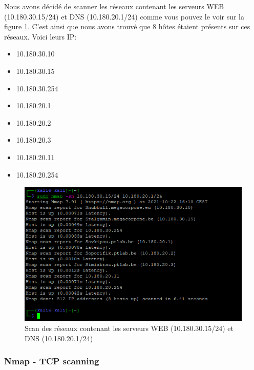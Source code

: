 \documentclass[french,paper=a4,oneside,captions=tableheading]{article}
\begin{document}
Nous avons décidé de scanner les réseaux contenant les serveurs WEB (10.180.30.15/24) et DNS (10.180.20.1/24) comme vous pouvez le voir sur la figure \ref{fig:NetworkScan}. C'est ainsi que nous avons trouvé que 8 hôtes étaient présents sur ces réseaux. Voici leurs IP:
\begin{itemize}
    \item 10.180.30.10
    \item 10.180.30.15
    \item 10.180.30.254
    \item 10.180.20.1
    \item 10.180.20.2
    \item 10.180.20.3
    \item 10.180.20.11
    \item 10.180.20.254
\end{itemize}

\begin{figure}[H]
    \centering
    \includegraphics[width=15cm]{images/Secu_Offensive_10.png}
    \caption{Scan des réseaux contenant les serveurs WEB (10.180.30.15/24) et DNS (10.180.20.1/24)}
    \label{fig:NetworkScan}
\end{figure}



\subsubsection{Nmap - TCP scanning}
\end{document}
